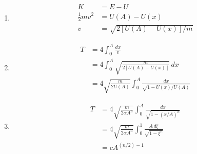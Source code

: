 \documentclass{article}
\begin{document}
\begin{enumerate}
  \item

        \begin{align*}
          K                 & = E - U                      \\
          \frac{1}{2} m v^2 & = U(A) - U(x)                \\
          v                 & = \sqrt{2 [U(A) - U(x)] / m}
        \end{align*}

  \item

        \begin{align*}
          T & = 4 \int_0^A \frac{dx}{v}                                              \\
            & = 4 \int_0^A \sqrt{\frac{m}{2 [U(A) - U(x)]}} \,dx                     \\
            & = 4 \sqrt{\frac{m}{2 U(A)}} \int_0^A \frac{dx}{\sqrt{1 - U(x) / U(A)}}
        \end{align*}

  \item

        \begin{align*}
          T & = 4 \sqrt{\frac{m}{2 \alpha A^n}} \int_0^A \frac{dx}{\sqrt{1 - (x / A)^n}}    \\
            & = 4 \sqrt{\frac{m}{2 \alpha A^n}} \int_0^1 \frac{A \,d \xi}{\sqrt{1 - \xi^n}} \\
            & = c A^{(n / 2) - 1}
        \end{align*}
\end{enumerate}
\end{document}
